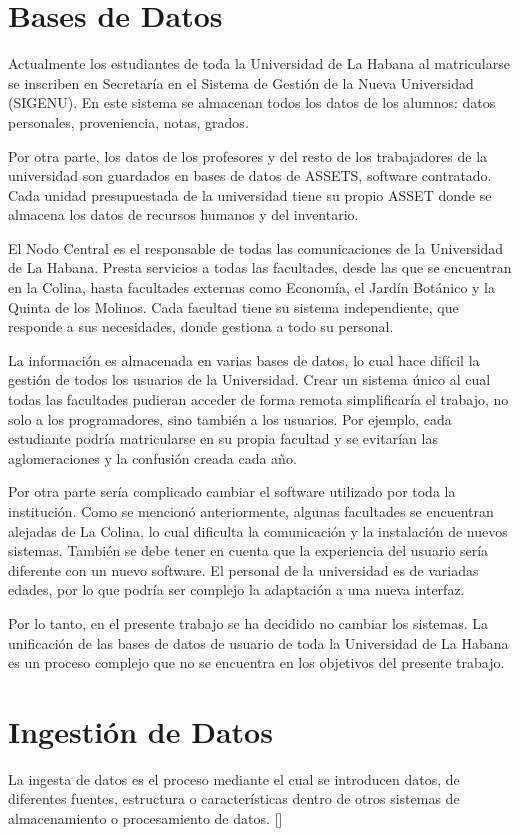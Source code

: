 \section*{Bases de Datos}

Actualmente los estudiantes de toda la Universidad de La Habana al matricularse se inscriben en Secretaría en el Sistema de Gestión de la Nueva Universidad (SIGENU). En este sistema se almacenan todos los datos de los alumnos: datos personales, proveniencia, notas, grados.

Por otra parte, los datos de los profesores y del resto de los trabajadores de la universidad son guardados en bases de datos de ASSETS, software contratado. Cada unidad presupuestada de la universidad tiene su propio ASSET donde se almacena los datos de recursos humanos y del inventario.

El Nodo Central es el responsable de todas las comunicaciones de la Universidad de La Habana. Presta servicios a todas las facultades, desde las que se encuentran en la Colina, hasta facultades externas como Economía, el Jardín Botánico y la Quinta de los Molinos. Cada facultad tiene su sistema independiente, que responde a sus necesidades, donde gestiona a todo su personal. 

La información es almacenada en varias bases de datos, lo cual hace difícil la gestión de todos los usuarios de la Universidad. Crear un sistema único al cual todas las facultades pudieran acceder de forma remota simplificaría el trabajo, no solo a los programadores, sino también a los usuarios. Por ejemplo, cada estudiante podría matricularse en su propia facultad y se evitarían las aglomeraciones y la confusión creada cada año. 

Por otra parte sería complicado cambiar el software utilizado por toda la institución. Como se mencionó anteriormente, algunas facultades se encuentran alejadas de La Colina, lo cual dificulta la comunicación y la instalación de nuevos sistemas. También se debe tener en cuenta que la experiencia del usuario sería diferente con un nuevo software. El personal de la universidad es de variadas edades, por lo que podría ser complejo la adaptación a una nueva interfaz.

Por lo tanto, en el presente trabajo se ha decidido no cambiar los sistemas. La unificación de las bases de datos de usuario de toda la Universidad de La Habana es un proceso complejo que no se encuentra en los objetivos del presente trabajo. 

\section*{Ingestión de Datos}
La ingesta de datos es el proceso mediante el cual se introducen datos, de diferentes fuentes,
estructura o características dentro de otros sistemas de almacenamiento o procesamiento de
datos.  [\cite{fernandez2020aplicacion}]


